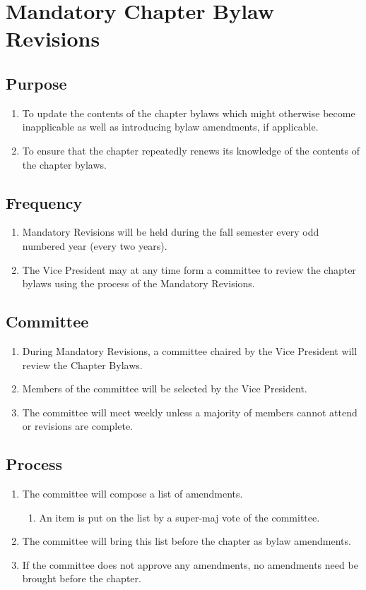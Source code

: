 \chapter{Mandatory Chapter Bylaw Revisions}
\section{Purpose}
	\begin{enumerate}
		\item To update the contents of the chapter bylaws which might otherwise become inapplicable as well as introducing bylaw amendments, if applicable.
		\item To ensure that the chapter repeatedly renews its knowledge of the contents of the chapter bylaws.
	\end{enumerate}


\section{Frequency}
	\begin{enumerate}
		\item Mandatory Revisions will be held during the fall semester every odd numbered year (every two years).
		\item The Vice President may at any time form a committee to review the chapter bylaws using the process of the Mandatory Revisions.
	\end{enumerate}

\section{Committee} 
	\label{bylaw-revisions}
	\begin{enumerate}
		\item During Mandatory Revisions, a committee chaired by the Vice President will review the Chapter Bylaws.
		\item Members of the committee will be selected by the Vice President.
		\item The committee will meet weekly unless a majority of members cannot attend or revisions are complete.
	\end{enumerate}

\section{Process}
	\begin{enumerate}
		\item The committee will compose a list of amendments.
		\begin{enumerate}
			\item An item is put on the list by a \gls{super-maj} vote of the committee.
		\end{enumerate}
		\item The committee will bring this list before the chapter as bylaw amendments.
		\item If the committee does not approve any amendments, no amendments need be brought before the chapter.
	\end{enumerate}
